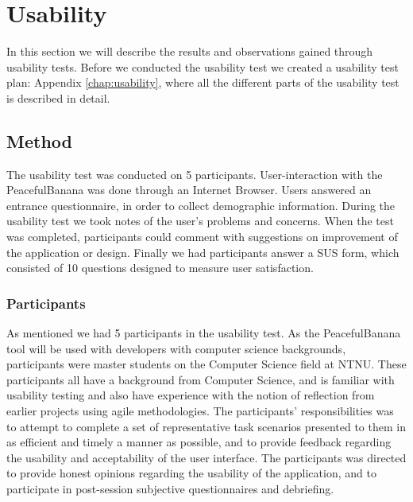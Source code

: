 
\chapter{Usability}
In this section we will describe the results and observations gained through usability tests. Before we conducted the usability test we created a usability test plan: Appendix \ref{chap:usability}, where all the different parts of the usability test is described in detail.
\section{Method}
The usability test was conducted on 5 participants. User-interaction with the PeacefulBanana was done through an Internet Browser. Users answered an entrance questionnaire, in order to collect demographic information. During the usability test we took notes of the user's problems and concerns. When the test was completed, participants could comment with suggestions on improvement of the application or design. Finally we had participants answer a SUS form, which consisted of 10 questions designed to measure user satisfaction. 

\subsection{Participants}
As mentioned we had 5 participants in the usability test. As the PeacefulBanana tool will be used with developers with computer science backgrounds, participants were master students on the Computer Science field at NTNU. These participants all have a background from Computer Science, and is familiar with usability testing and also have experience with the notion of reflection from earlier projects using agile methodologies.
The participants' responsibilities was to attempt to complete a set of representative task scenarios presented to them in as efficient and timely a manner as possible, and to provide feedback regarding the usability and acceptability of the user interface. The participants was directed to provide honest opinions regarding the usability of the application, and to participate in post-session subjective questionnaires and debriefing.

